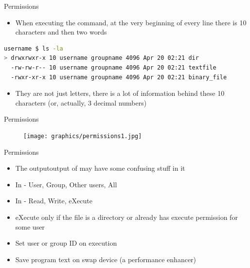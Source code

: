 \documentclass[usenames,dvipsnames,10pt,aspectratio=169]{beamer}
\begin{document}
\begin{frame}[fragile]{Permissions}
    \begin{itemize}
        \item When executing the  command, at the very beginning of every line there is 10 characters and then two words
    \end{itemize}
    \begin{lstlisting}[language=bash, style=shellstyle]
username $ ls -la
> drwxrwxr-x 10 username groupname 4096 Apr 20 02:21 dir
  -rw-rw-r-- 10 username groupname 4096 Apr 20 02:21 textfile
  -rwxr-xr-x 10 username groupname 4096 Apr 20 02:21 binary_file
        \end{lstlisting}
    \begin{itemize}    
        \item They are not just letters, there is a lot of information behind these 10 characters (or, actually, 3 decimal numbers)
    \end{itemize}
\end{frame}

\begin{frame}{Permissions}
    \begin{figure}
        \centering
        \texttt{[image: graphics/permissions1.jpg]}
\end{figure}
\end{frame}


\begin{frame}{Permissions}
    \begin{itemize}
        \item The outputoutput of   may have some confusing stuff in it
        \item In \ex{[ugoa]} - User, Group, Other users, All
        \item In \ex{[rwxXst]} - Read, Write, eXecute
        \item eXecute only if the file is a directory or already has execute permission for some user
        \item Set user or group ID on execution
        \item Save program text on swap device (a performance enhancer)
    \end{itemize}
\end{frame}
\end{document}
